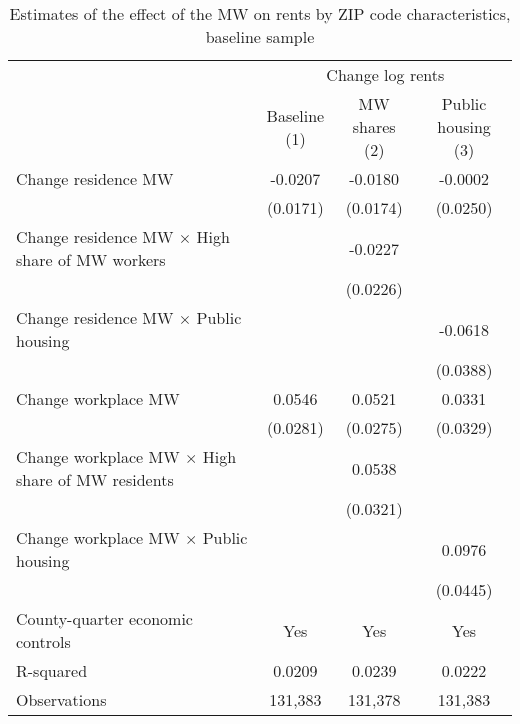 \begin{table}[hbt!] \centering
    \caption{Estimates of the effect of the MW on rents by ZIP code characteristics, baseline sample}
    \label{tab:heterogeneity}
    \begin{tabular}{@{}lccc@{}}
        \toprule
            & \multicolumn{3}{c}{Change log rents}                                                  \\ \cmidrule(l){2-4} 
            & \shortstack{Baseline\\(1)} 
            & \shortstack{MW shares\\(2)}                                             
            & \shortstack{Public housing\\(3)}                                                      \\ \midrule
        Change residence MW                                     &  -0.0207   &  -0.0180  &  -0.0002   \\
                                                                & (0.0171)  & (0.0174) & (0.0250)  \\
        Change residence MW $\times$ High share of MW workers   &        &  -0.0227  &        \\
                                                                &        & (0.0226) &        \\
        Change residence MW $\times$ Public housing             &        &       &  -0.0618   \\
                                                                &        &       & (0.0388)  \\
        Change workplace MW                                     &  0.0546   &  0.0521  &  0.0331   \\
                                                                & (0.0281)  & (0.0275) & (0.0329)  \\
        Change workplace MW $\times$ High share of MW residents &        &  0.0538  &        \\
                                                                &        & (0.0321) &        \\
        Change workplace MW $\times$ Public housing             &        &       &  0.0976   \\
                                                                &        &       & (0.0445)  \\
        County-quarter economic controls                        &  Yes   &  Yes  &   Yes  \\
        R-squared                                               &  0.0209   &  0.0239  &   0.0222  \\
        Observations                                            &  131,383  &  131,378 &   131,383 \\ \bottomrule
    \end{tabular}


\end{table}
